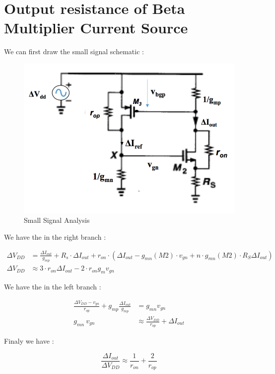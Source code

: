 \chapter{Output resistance of Beta Multiplier Current Source}

We can first draw the small signal schematic :

\begin{figure}[h]
  \begin{center}
    \includegraphics[scale=0.25]{photo/small_sig_bm}
  \end{center}
  \caption{Small Signal Analysis}
  \label{deltaiout}
\end{figure}

We have the in the right branch :

\begin{align}
  \Delta V_{DD} & = \frac{\Delta I_{out}}{g_{mp}} + R_s\cdot \Delta I_{out} + r_{on}\cdot ( \Delta I_{out} - g_{mn}(M2)\cdot v_{gn} + n \cdot g_{mn}(M2) \cdot R_S \Delta I_{out}  ) \\ 
  \Delta V_{DD} & \approx 3 \cdot r_{on} \Delta I_{out} - 2 \cdot r_{on} g_m v_{gn} 
\end{align}

We have the in the left branch :

\begin{align}
  \frac{\Delta V_{DD} - v_{gn}}{r_{op}} + g_{mp} \frac{\Delta I_{out}}{g_{mp}} & = g_{mn} v_{gn} \\ 
  g_{mn}~v_{gn} & \approx \frac{\Delta V_{DD}}{r_{op}} + \Delta I_{out}  
\end{align}

Finaly we have :

\begin{equation}
  \frac{\Delta I_{out}}{\Delta V_{DD}} \approx \frac{1}{r_{on}} + \frac{2}{r_{op}}
\end{equation}